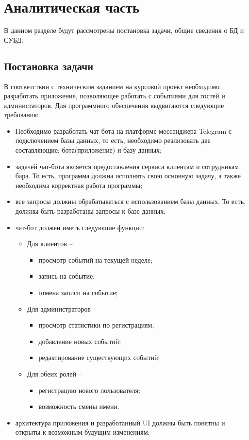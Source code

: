 \documentclass[12pt,a4paper,oneside]{report}
\begin{document}
\clearpage

\chapter{Аналитическая часть}
\quad В данном разделе будут рассмотрены постановка задачи, общие сведения о БД и СУБД.

\section{Постановка задачи}

\quad В соответствии с техническим заданием на курсовой проект необходимо разработать приложение, позволяющее работать с событиями для гостей и администаторов. Для программного обеспечения выдвигаются следующие требования:
\begin{itemize}
    \item Необходимо разработать чат-бота на платформе мессенджера Telegram с подключением базы данных, то есть, необходимо реализовать две составляющие: бота(приложение) и базу данных;
    \item задачей чат-бота является предоставления сервиса клиентам и сотрудникам бара. То есть, программа должна исполнять свою основную задачу, а также необходима корректная работа программы;
    \item все запросы должны обрабатываться с использованием базы данных. То есть, должны быть разработаны запросы к базе данных;
    \item чат-бот должен иметь следующие функции:
    \begin{itemize}
        \item Для клиентов –
        \begin{itemize}
            \item просмотр событий на текущей неделе;
            \item запись на событие;
            \item отмена записи на событие;
        \end{itemize}
        \item Для администраторов –
        \begin{itemize}
            \item просмотр статистики по регистрациям;
            \item добавление новых событий;
            \item редактирование существующих событий;
        \end{itemize}
        \item Для обеих ролей –
        \begin{itemize}
            \item регистрацию нового пользователя;
            \item возможность смены имени.
        \end{itemize}
    \end{itemize}
    \item архитектура приложения и разработанный UI должны быть понятны и открыты к возможным будущим изменениям.
\end{itemize}
\end{document}
